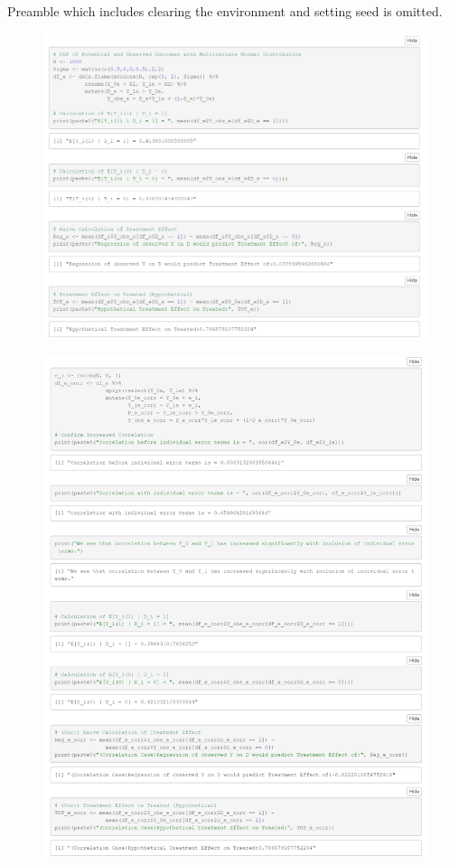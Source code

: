 \documentclass[12pt]{article}
\begin{document}
Preamble which includes clearing the environment and setting seed is omitted.

\begin{figure}[h!tp]
    \centering
    \includegraphics[width=15cm]{Q3e_p1}
\end{figure}

\begin{figure}[h!tp]
    \centering
    \includegraphics[width=15cm]{Q3e_p2}
\end{figure}
\FloatBarrier
\end{document}
